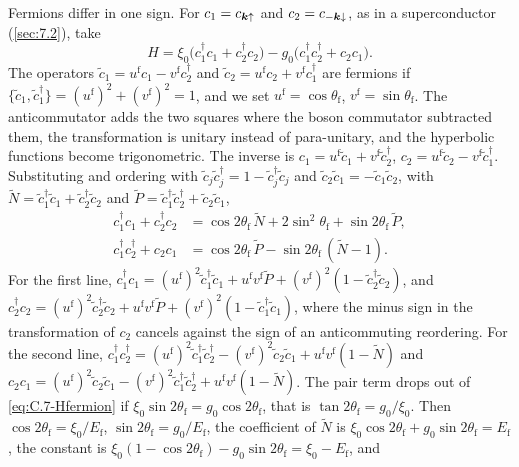 Fermions differ in one sign. For $c_1 = c_{\bm{k}\uparrow}$ and $c_2 = c_{-\bm{k}\downarrow}$, as in a superconductor (\cref{sec:7.2}), take
\begin{equation}
  H = \xi_0\bigl(c_1^\dagger c_1 + c_2^\dagger c_2\bigr) - g_0\bigl(c_1^\dagger c_2^\dagger + c_2c_1\bigr) .
  \label{eq:C.7-Hfermion}
\end{equation}
The operators $\tilde c_1 = u^{\mathrm{f}}c_1 - v^{\mathrm{f}}c_2^\dagger$ and $\tilde c_2 = u^{\mathrm{f}}c_2 + v^{\mathrm{f}}c_1^\dagger$ are fermions if $\{\tilde c_1, \tilde c_1^\dagger\} = (u^{\mathrm{f}})^2 + (v^{\mathrm{f}})^2 = 1$, and we set $u^{\mathrm{f}} = \cos\theta_{\mathrm{f}}$, $v^{\mathrm{f}} = \sin\theta_{\mathrm{f}}$. The anticommutator adds the two squares where the boson commutator subtracted them, the transformation is unitary instead of para-unitary, and the hyperbolic functions become trigonometric. The inverse is $c_1 = u^{\mathrm{f}}\tilde c_1 + v^{\mathrm{f}}\tilde c_2^\dagger$, $c_2 = u^{\mathrm{f}}\tilde c_2 - v^{\mathrm{f}}\tilde c_1^\dagger$. Substituting and ordering with $\tilde c_j\tilde c_j^\dagger = 1 - \tilde c_j^\dagger\tilde c_j$ and $\tilde c_2\tilde c_1 = -\tilde c_1\tilde c_2$, with $\tilde N = \tilde c_1^\dagger\tilde c_1 + \tilde c_2^\dagger\tilde c_2$ and $\tilde P = \tilde c_1^\dagger\tilde c_2^\dagger + \tilde c_2\tilde c_1$,
\begin{align*}
  c_1^\dagger c_1 + c_2^\dagger c_2 &= \cos2\theta_{\mathrm{f}}\,\tilde N + 2\sin^2\theta_{\mathrm{f}} + \sin2\theta_{\mathrm{f}}\,\tilde P ,\\
  c_1^\dagger c_2^\dagger + c_2c_1 &= \cos2\theta_{\mathrm{f}}\,\tilde P - \sin2\theta_{\mathrm{f}}\,(\tilde N - 1) .
\end{align*}
For the first line, $c_1^\dagger c_1 = (u^{\mathrm{f}})^2\tilde c_1^\dagger\tilde c_1 + u^{\mathrm{f}}v^{\mathrm{f}}\tilde P + (v^{\mathrm{f}})^2(1 - \tilde c_2^\dagger\tilde c_2)$, and $c_2^\dagger c_2 = (u^{\mathrm{f}})^2\tilde c_2^\dagger\tilde c_2 + u^{\mathrm{f}}v^{\mathrm{f}}\tilde P + (v^{\mathrm{f}})^2(1 - \tilde c_1^\dagger\tilde c_1)$, where the minus sign in the transformation of $c_2$ cancels against the sign of an anticommuting reordering. For the second line, $c_1^\dagger c_2^\dagger = (u^{\mathrm{f}})^2\tilde c_1^\dagger\tilde c_2^\dagger - (v^{\mathrm{f}})^2\tilde c_2\tilde c_1 + u^{\mathrm{f}}v^{\mathrm{f}}(1 - \tilde N)$ and $c_2c_1 = (u^{\mathrm{f}})^2\tilde c_2\tilde c_1 - (v^{\mathrm{f}})^2\tilde c_1^\dagger\tilde c_2^\dagger + u^{\mathrm{f}}v^{\mathrm{f}}(1 - \tilde N)$. The pair term drops out of \cref{eq:C.7-Hfermion} if $\xi_0\sin2\theta_{\mathrm{f}} = g_0\cos2\theta_{\mathrm{f}}$, that is $\tan2\theta_{\mathrm{f}} = g_0/\xi_0$. Then $\cos2\theta_{\mathrm{f}} = \xi_0/E_{\mathrm{f}}$, $\sin2\theta_{\mathrm{f}} = g_0/E_{\mathrm{f}}$, the coefficient of $\tilde N$ is $\xi_0\cos2\theta_{\mathrm{f}} + g_0\sin2\theta_{\mathrm{f}} = E_{\mathrm{f}}$, the constant is $\xi_0(1 - \cos2\theta_{\mathrm{f}}) - g_0\sin2\theta_{\mathrm{f}} = \xi_0 - E_{\mathrm{f}}$, and
